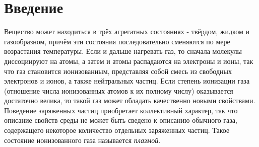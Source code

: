 \section*{Введение}

Вещество может находиться в трёх агрегатных состояниях - твёрдом, жидком и газообразном, причём эти состояния последовательно сменяются по мере возрастания температуры. Если и дальше нагревать газ, то сначала молекулы диссоциируют на атомы, а затем и атомы распадаются на электроны и ионы, так что газ становится ионизованным, представляя собой смесь из свободных электронов и ионов, а также нейтральных частиц. Если степень ионизации газа (отношение числа ионизованных атомов к их полному числу) оказывается достаточно велика, то такой газ может обладать качественно новыми свойствами. Поведение заряженных частиц приобретает коллективный характер, так что описание свойств среды не может быть сведено к описанию обычного газа, содержащего некоторое количество отдельных заряженных частиц. Такое состояние ионизованного газа называется \textit{плазмой}.